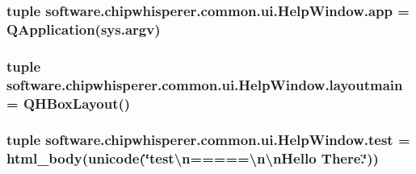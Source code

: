 \subsubsection[{app}]{\setlength{\rightskip}{0pt plus 5cm}tuple software.\+chipwhisperer.\+common.\+ui.\+Help\+Window.\+app = Q\+Application(sys.\+argv)}\label{namespacesoftware_1_1chipwhisperer_1_1common_1_1ui_1_1HelpWindow_aa332a61a44fd34a5b42551efb342cc0c}
\hypertarget{namespacesoftware_1_1chipwhisperer_1_1common_1_1ui_1_1HelpWindow_af78b8102e9200cb5b721f55f81f81561}{}
\subsubsection[{layoutmain}]{\setlength{\rightskip}{0pt plus 5cm}tuple software.\+chipwhisperer.\+common.\+ui.\+Help\+Window.\+layoutmain = Q\+H\+Box\+Layout()}\label{namespacesoftware_1_1chipwhisperer_1_1common_1_1ui_1_1HelpWindow_af78b8102e9200cb5b721f55f81f81561}
\hypertarget{namespacesoftware_1_1chipwhisperer_1_1common_1_1ui_1_1HelpWindow_a6b7e91449c35dc76ffa124f92fbd5265}{}
\subsubsection[{test}]{\setlength{\rightskip}{0pt plus 5cm}tuple software.\+chipwhisperer.\+common.\+ui.\+Help\+Window.\+test = {\bf html\+\_\+body}(unicode(\char`\"{}test\textbackslash{}n=====\textbackslash{}n\textbackslash{}n\+Hello There.\char`\"{}))}\label{namespacesoftware_1_1chipwhisperer_1_1common_1_1ui_1_1HelpWindow_a6b7e91449c35dc76ffa124f92fbd5265}
\hypertarget{namespacesoftware_1_1chipwhisperer_1_1common_1_1ui_1_1HelpWindow_a089170c473735215005185584cf7b156}{}
